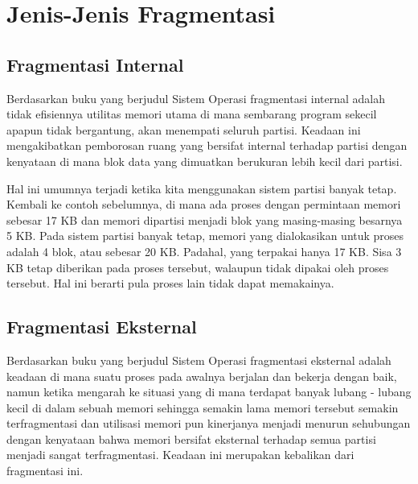 ﻿%

\section{Jenis-Jenis Fragmentasi}
\subsection{Fragmentasi Internal}
Berdasarkan buku yang berjudul Sistem Operasi \cite{pangera2005sistem} fragmentasi internal adalah tidak efisiennya utilitas memori utama di mana sembarang program sekecil apapun tidak bergantung, akan menempati seluruh partisi. Keadaan ini mengakibatkan pemborosan ruang yang bersifat internal terhadap partisi dengan kenyataan di 
mana blok data yang dimuatkan berukuran lebih kecil dari partisi.

Hal ini umumnya terjadi ketika kita menggunakan sistem partisi banyak tetap. Kembali ke contoh sebelumnya, di mana ada proses dengan permintaan memori sebesar 17 KB dan memori dipartisi menjadi blok yang masing-masing besarnya 5 KB. Pada sistem partisi banyak tetap, memori yang dialokasikan untuk proses adalah 4 blok, atau sebesar 20 KB. Padahal, yang terpakai hanya 17 KB. Sisa 3 KB tetap diberikan pada proses tersebut, walaupun tidak dipakai oleh proses tersebut. Hal ini berarti pula proses lain tidak dapat memakainya.


\subsection{Fragmentasi Eksternal}
Berdasarkan buku yang berjudul Sistem Operasi \cite{pangera2005sistem} fragmentasi eksternal adalah keadaan di mana suatu proses pada awalnya berjalan dan bekerja dengan baik, namun ketika mengarah ke situasi yang di mana terdapat banyak lubang - lubang kecil di dalam sebuah memori sehingga semakin lama memori tersebut semakin terfragmentasi dan utilisasi memori pun kinerjanya menjadi menurun sehubungan dengan kenyataan bahwa memori bersifat eksternal terhadap semua partisi menjadi sangat terfragmentasi. Keadaan ini merupakan kebalikan dari fragmentasi ini.

